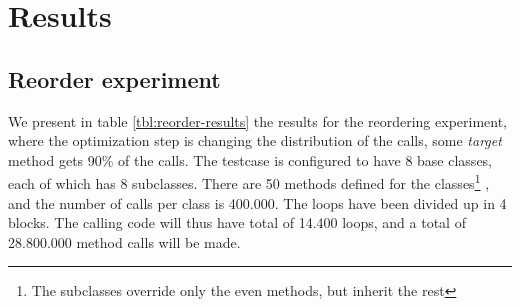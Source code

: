 \documentclass[a4paper,11pt]{scrartcl}
\begin{document}
\section{Results}
\label{sec:results}

\subsection{Reorder experiment}
\label{sec:results-reorder}

We present in table \ref{tbl:reorder-results} the results for the reordering experiment, where the optimization step is changing the distribution of the calls, some \textit{target} method gets 90\% of the calls. The testcase is configured to have 8 base classes, each of which has 8 subclasses. There are 50 methods defined for the classes\footnote{The subclasses override only the even methods, but inherit the rest} , and the number of calls per class is 400.000.  The loops have been divided up in 4 blocks. The calling code will thus have total of 14.400 loops, and a total of 28.800.000 method calls will be made. 
\end{document}
